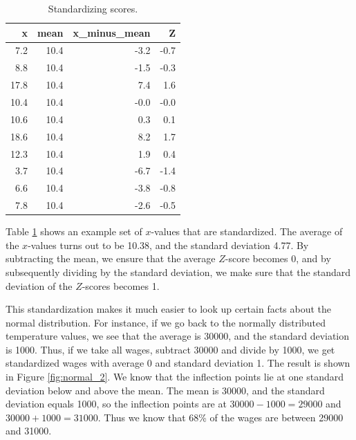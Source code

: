 \documentclass[]{report}\usepackage[]{graphicx}\usepackage[]{color}
\begin{document}
\begin{table}[ht]
\centering
\caption{Standardizing scores.} 
\label{tab:normal_1}
\begin{tabular}{rrrr}
  \hline
x & mean & x\_minus\_mean & Z \\ 
  \hline
7.2 & 10.4 & -3.2 & -0.7 \\ 
  8.8 & 10.4 & -1.5 & -0.3 \\ 
  17.8 & 10.4 & 7.4 & 1.6 \\ 
  10.4 & 10.4 & -0.0 & -0.0 \\ 
  10.6 & 10.4 & 0.3 & 0.1 \\ 
  18.6 & 10.4 & 8.2 & 1.7 \\ 
  12.3 & 10.4 & 1.9 & 0.4 \\ 
  3.7 & 10.4 & -6.7 & -1.4 \\ 
  6.6 & 10.4 & -3.8 & -0.8 \\ 
  7.8 & 10.4 & -2.6 & -0.5 \\ 
   \hline
\end{tabular}
\end{table}


Table \ref{tab:normal_1} shows an example set of $x$-values that are standardized. The average of the $x$-values turns out to be 10.38, and the standard deviation 4.77. By subtracting the mean, we ensure that the average $Z$-score becomes 0, and by subsequently dividing by the standard deviation, we make sure that the standard deviation of the $Z$-scores becomes 1.

This standardization makes it much easier to look up certain facts about the normal distribution. For instance, if we go back to the normally distributed temperature values, we see that the average is 30000, and the standard deviation is 1000. Thus, if we take all wages, subtract 30000 and divide by 1000, we get standardized wages with average 0 and standard deviation 1. The result is shown in Figure \ref{fig:normal_2}. We know that the inflection points lie at one standard deviation below and above the mean. The mean is 30000, and the standard deviation equals 1000, so the inflection points are at $30000-1000=29000$ and $30000+1000=31000$. Thus we know that 68\% of the wages are between 29000 and 31000.
\end{document}
